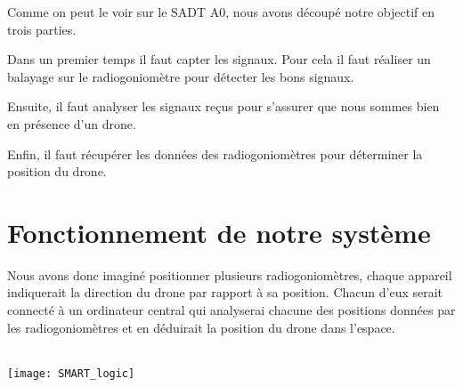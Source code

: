 \newpage
\parindent=15pt

Comme on peut le voir sur le SADT A0, nous avons découpé notre objectif en trois parties.

Dans un premier temps il faut capter les signaux. Pour cela il faut réaliser un balayage sur le radiogoniomètre pour détecter les bons signaux.

Ensuite, il faut analyser les signaux reçus pour s'assurer que nous sommes bien en présence d'un drone.

Enfin, il faut récupérer les données des radiogoniomètres pour déterminer la position du drone.


\section{Fonctionnement de notre système}

Nous avons donc imaginé positionner plusieurs radiogoniomètres, chaque appareil indiquerait la direction du drone par rapport à sa position. Chacun d'eux serait connecté à un ordinateur central qui analyserai chacune des positions données par les radiogoniomètres et en déduirait la position du drone dans l'espace.

~\\

\texttt{[image: SMART\_logic]}




